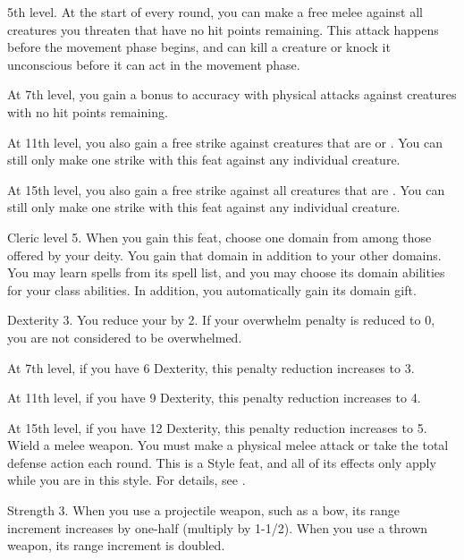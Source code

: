     \featpres 5th level.
    \featben At the start of every round, you can make a free melee  against all creatures you threaten that have no hit points remaining.
    This attack happens before the movement phase begins, and can kill a creature or knock it unconscious before it can act in the movement phase.

    At 7th level, you gain a  bonus to accuracy with physical attacks against creatures with no hit points remaining.

    At 11th level, you also gain a free strike against creatures that are \helpless or \unaware.
    You can still only make one strike with this feat against any individual creature.

    At 15th level, you also gain a free strike against all creatures that are \bloodied.
    You can still only make one strike with this feat against any individual creature.

    \featpre Cleric level 5.
    \featben When you gain this feat, choose one domain from among those offered by your deity.
    You gain that domain in addition to your other domains.
    You may learn spells from its spell list, and you may choose its domain abilities for your class abilities.
    In addition, you automatically gain its domain gift.

    \featpres Dexterity 3.
    \featben You reduce your  by 2.
    If your overwhelm penalty is reduced to 0, you are not considered to be overwhelmed.

    At 7th level, if you have 6 Dexterity, this penalty reduction increases to 3.

    At 11th level, if you have 9 Dexterity, this penalty reduction increases to 4.

    At 15th level, if you have 12 Dexterity, this penalty reduction increases to 5.
    \stylereq Wield a melee weapon. You must make a physical melee attack or take the total defense action each round.
     This is a Style feat, and all of its effects only apply while you are in this style.
    For details, see .

    \featpre Strength 3.
    \featben When you use a projectile weapon, such as a bow, its range increment increases by one-half (multiply by 1-1/2).
    When you use a thrown weapon, its range increment is doubled.


